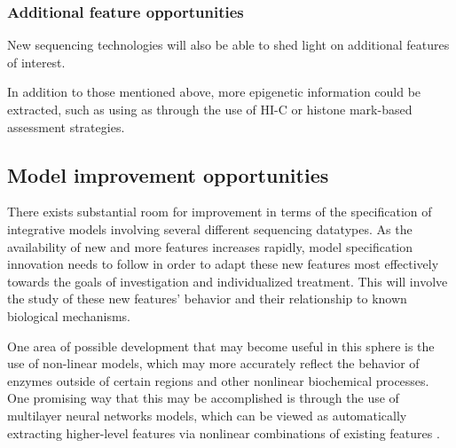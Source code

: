 \subsubsection{Additional feature opportunities}
New sequencing technologies will also be able to shed light on additional features of interest.

In addition to those mentioned above, more epigenetic information could be extracted, such as using as through the use of HI-C\cite{yaffe_probabilistic_2011} or histone mark-based assessment strategies.

\subsection{Model improvement opportunities}

There exists substantial room for improvement in terms of the specification of integrative models involving several different sequencing datatypes. As the availability of new and more features increases rapidly, model specification innovation needs to follow in order to adapt these new features most effectively towards the goals of investigation and individualized treatment. This will involve the study of these new features' behavior and their relationship to known biological mechanisms. 

One area of possible development that may become useful in this sphere is the use of non-linear models, which may more accurately reflect the behavior of enzymes outside of certain regions and other nonlinear biochemical processes. One promising way that this may be accomplished is through the use of multilayer neural networks models, which can be viewed as automatically extracting higher-level features via nonlinear combinations of existing features \cite{jesse_dunietz_fundamental_2016}.